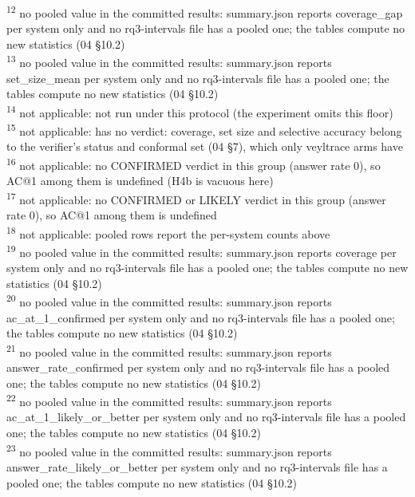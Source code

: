 \begin{table}[t]
\textsuperscript{12} no pooled value in the committed results: summary.json reports coverage\_gap per system only and no rq3-intervals file has a pooled one; the tables compute no new statistics (04 \S{}10.2)\\
\textsuperscript{13} no pooled value in the committed results: summary.json reports set\_size\_mean per system only and no rq3-intervals file has a pooled one; the tables compute no new statistics (04 \S{}10.2)\\
\textsuperscript{14} not applicable: not run under this protocol (the experiment omits this floor)\\
\textsuperscript{15} not applicable: has no verdict: coverage, set size and selective accuracy belong to the verifier's status and conformal set (04 \S{}7), which only veyltrace arms have\\
\textsuperscript{16} not applicable: no CONFIRMED verdict in this group (answer rate 0), so AC@1 among them is undefined (H4b is vacuous here)\\
\textsuperscript{17} not applicable: no CONFIRMED or LIKELY verdict in this group (answer rate 0), so AC@1 among them is undefined\\
\textsuperscript{18} not applicable: pooled rows report the per-system counts above\\
\textsuperscript{19} no pooled value in the committed results: summary.json reports coverage per system only and no rq3-intervals file has a pooled one; the tables compute no new statistics (04 \S{}10.2)\\
\textsuperscript{20} no pooled value in the committed results: summary.json reports ac\_at\_1\_confirmed per system only and no rq3-intervals file has a pooled one; the tables compute no new statistics (04 \S{}10.2)\\
\textsuperscript{21} no pooled value in the committed results: summary.json reports answer\_rate\_confirmed per system only and no rq3-intervals file has a pooled one; the tables compute no new statistics (04 \S{}10.2)\\
\textsuperscript{22} no pooled value in the committed results: summary.json reports ac\_at\_1\_likely\_or\_better per system only and no rq3-intervals file has a pooled one; the tables compute no new statistics (04 \S{}10.2)\\
\textsuperscript{23} no pooled value in the committed results: summary.json reports answer\_rate\_likely\_or\_better per system only and no rq3-intervals file has a pooled one; the tables compute no new statistics (04 \S{}10.2)\\

\end{table}
